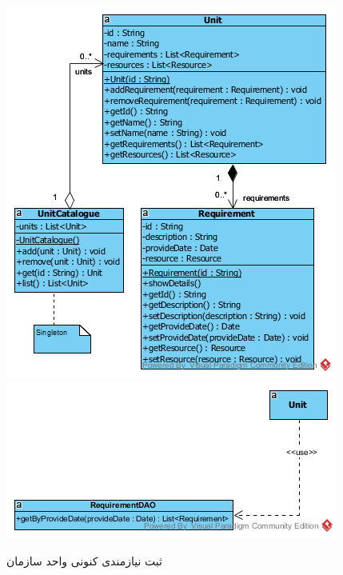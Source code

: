 \begin{landscape}
\begin{figure}[H]
	\centering
	\includegraphics[scale=0.7]{img/sequence-design/AddRequirementToUnitC}
	\includegraphics[scale=0.7]{img/sequence-design/AddRequirementToUnitD}
	\caption{ثبت نیازمندی کنونی واحد سازمان}
\end{figure}

\newpage

\end{landscape}
